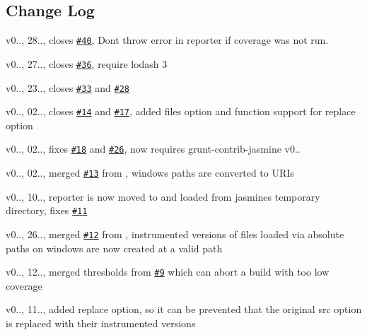 \subsection*{Change Log}


\begin{DoxyItemize}
\item v0.., 28.., closes \href{https://github.com/maenu/grunt-template-jasmine-istanbul/issues/40}{\tt \#40}, Don\textquotesingle{}t throw error in reporter if coverage was not run.
\item v0.., 27.., closes \href{https://github.com/maenu/grunt-template-jasmine-istanbul/issues/36}{\tt \#36}, require lodash 3
\item v0.., 23.., closes \href{https://github.com/maenu/grunt-template-jasmine-istanbul/issues/33}{\tt \#33} and \href{https://github.com/maenu/grunt-template-jasmine-istanbul/issues/28}{\tt \#28}
\item v0.., 02.., closes \href{https://github.com/maenu/grunt-template-jasmine-istanbul/issues/14}{\tt \#14} and \href{https://github.com/maenu/grunt-template-jasmine-istanbul/issues/17}{\tt \#17}, added {\ttfamily files} option and function support for {\ttfamily replace} option
\item v0.., 02.., fixes \href{https://github.com/maenu/grunt-template-jasmine-istanbul/issues/18}{\tt \#18} and \href{https://github.com/maenu/grunt-template-jasmine-istanbul/issues/26}{\tt \#26}, now requires grunt-\/contrib-\/jasmine v0..
\item v0.., 02.., merged \href{https://github.com/maenu/grunt-template-jasmine-istanbul/issues/13}{\tt \#13} from , windows paths are converted to U\+R\+Is
\item v0.., 10.., reporter is now moved to and loaded from jasmine\textquotesingle{}s temporary directory, fixes \href{https://github.com/maenu/grunt-template-jasmine-istanbul/issues/11}{\tt \#11}
\item v0.., 26.., merged \href{https://github.com/maenu/grunt-template-jasmine-istanbul/issues/12}{\tt \#12} from , instrumented versions of files loaded via absolute paths on windows are now created at a valid path
\item v0.., 12.., merged {\ttfamily thresholds} from  \href{https://github.com/maenu/grunt-template-jasmine-istanbul/issues/9}{\tt \#9} which can abort a build with too low coverage
\item v0.., 11.., added {\ttfamily replace} option, so it can be prevented that the original {\ttfamily src} option is replaced with their instrumented versions 
\end{DoxyItemize}